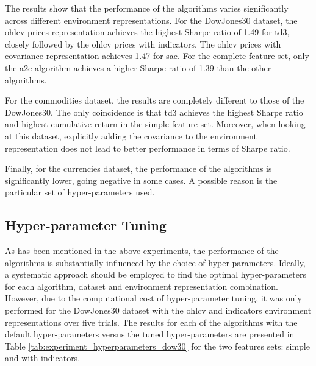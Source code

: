 

The results show that the performance of the algorithms varies significantly across different environment representations. For the DowJones30 dataset, the \acrshort{ohlcv} prices representation achieves the highest Sharpe ratio of 1.49 for \acrshort{td3}, closely followed by the \acrshort{ohlcv} prices with indicators. The \acrshort{ohlcv} prices with covariance representation achieves 1.47 for \acrshort{sac}. For the complete feature set, only the \acrshort{a2c} algorithm achieves a higher Sharpe ratio of 1.39 than the other algorithms.

For the commodities dataset, the results are completely different to those of the DowJones30. The only coincidence is that \acrshort{td3} achieves the highest Sharpe ratio and highest cumulative return in the simple feature set. Moreover, when looking at this dataset, explicitly adding the covariance to the environment representation does not lead to better performance in terms of Sharpe ratio.

Finally, for the currencies dataset, the performance of the algorithms is significantly lower, going negative in some cases. A possible reason is the particular set of hyper-parameters used. 

\subsection{Hyper-parameter Tuning} \label{sec:hyper-parameter-tuning}

As has been mentioned in the above experiments, the performance of the algorithms is substantially influenced by the choice of hyper-parameters. Ideally, a systematic approach should be employed to find the optimal hyper-parameters for each algorithm, dataset and environment representation combination. However, due to the computational cost of hyper-parameter tuning, it was only performed for the DowJones30 dataset with the \acrshort{ohlcv} and indicators environment representations over five trials. The results for each of the algorithms with the default hyper-parameters versus the tuned hyper-parameters are presented in Table \ref{tab:experiment_hyperparameters_dow30} for the two features sets: simple and with indicators.



